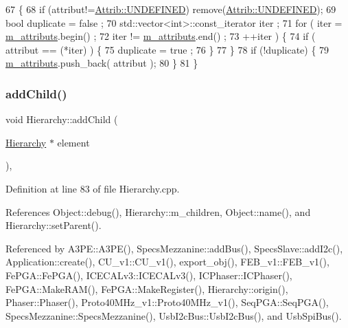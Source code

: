 \begin{DoxyCode}
67                             \{
68     \textcolor{keywordflow}{if} (attribut!=\hyperlink{classAttrib_a69e171d7cc6417835a5a306d3c764235a3a8da2ab97dda18aebab196fe4100531}{Attrib::UNDEFINED}) \textcolor{keyword}{remove}(\hyperlink{classAttrib_a69e171d7cc6417835a5a306d3c764235a3a8da2ab97dda18aebab196fe4100531}{Attrib::UNDEFINED});
69     \textcolor{keywordtype}{bool} duplicate = false ;
70     std::vector<int>::const\_iterator iter ;
71     \textcolor{keywordflow}{for} ( iter  = \hyperlink{classAttrib_ac4bd58a0cc6b38a3b711d609a3d3aacc}{m\_attributs}.begin() ;
72           iter != \hyperlink{classAttrib_ac4bd58a0cc6b38a3b711d609a3d3aacc}{m\_attributs}.end()   ;
73           ++iter ) \{
74       \textcolor{keywordflow}{if} ( attribut == (*iter) ) \{
75         duplicate = true ;
76       \}
77     \}
78     \textcolor{keywordflow}{if} (!duplicate) \{
79       \hyperlink{classAttrib_ac4bd58a0cc6b38a3b711d609a3d3aacc}{m\_attributs}.push\_back( attribut );
80     \}
81   \}
\end{DoxyCode}
\mbox{\label{classHierarchy_ad677774ff38fcb257c04a3a10d471fac}} 
\subsubsection{\texorpdfstring{add\+Child()}{addChild()}}
{\footnotesize\ttfamily void Hierarchy\+::add\+Child (\begin{DoxyParamCaption}\item[{\hyperlink{classHierarchy}{Hierarchy} $\ast$}]{element }\end{DoxyParamCaption})\hspace{0.3cm}{\ttfamily [virtual]}, {\ttfamily [inherited]}}



Definition at line 83 of file Hierarchy.\+cpp.



References Object\+::debug(), Hierarchy\+::m\+\_\+children, Object\+::name(), and Hierarchy\+::set\+Parent().



Referenced by A3\+P\+E\+::\+A3\+P\+E(), Specs\+Mezzanine\+::add\+Bus(), Specs\+Slave\+::add\+I2c(), Application\+::create(), C\+U\+\_\+v1\+::\+C\+U\+\_\+v1(), export\+\_\+obj(), F\+E\+B\+\_\+v1\+::\+F\+E\+B\+\_\+v1(), Fe\+P\+G\+A\+::\+Fe\+P\+G\+A(), I\+C\+E\+C\+A\+Lv3\+::\+I\+C\+E\+C\+A\+Lv3(), I\+C\+Phaser\+::\+I\+C\+Phaser(), Fe\+P\+G\+A\+::\+Make\+R\+A\+M(), Fe\+P\+G\+A\+::\+Make\+Register(), Hierarchy\+::origin(), Phaser\+::\+Phaser(), Proto40\+M\+Hz\+\_\+v1\+::\+Proto40\+M\+Hz\+\_\+v1(), Seq\+P\+G\+A\+::\+Seq\+P\+G\+A(), Specs\+Mezzanine\+::\+Specs\+Mezzanine(), Usb\+I2c\+Bus\+::\+Usb\+I2c\+Bus(), and Usb\+Spi\+Bus().


